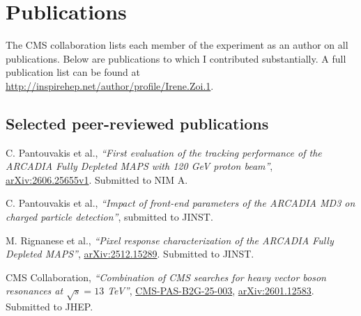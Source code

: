 \ifacademic
  \section{Publications}
The CMS collaboration lists each member of the experiment as an author on all publications. Below are publications to which I contributed substantially. A full publication list can be found at \\ \href{http://inspirehep.net/author/profile/Irene.Zoi.1}{http://inspirehep.net/author/profile/Irene.Zoi.1}.  

\subsection{Selected peer-reviewed publications}

\begin{refsection}
      \vspace{2mm}
      \onehalfspacing
C. Pantouvakis et al., {\sl ``First evaluation of the tracking performance of the ARCADIA Fully Depleted MAPS with 120 GeV proton beam''}, \href{https://arxiv.org/html/2606.25655v1}{arXiv:2606.25655v1}. Submitted to NIM A.
    \end{refsection}


\begin{refsection}
      \vspace{2mm}
      \onehalfspacing
C. Pantouvakis et al., {\sl ``Impact of front-end parameters of the ARCADIA MD3 on charged particle detection''}, submitted to JINST.
    \end{refsection}


\begin{refsection}
      \vspace{2mm}
      \onehalfspacing
M. Rignanese et al., {\sl ``Pixel response characterization of the ARCADIA Fully Depleted MAPS''},
\href{https://doi.org/10.48550/arXiv.2512.15289}{arXiv:2512.15289}. Submitted to JINST.
    \end{refsection}


    \begin{refsection}
      \vspace{2mm}
      \onehalfspacing
CMS Collaboration, {\sl ``Combination of CMS searches for heavy vector boson resonances at  $\sqrt{s}=13$ TeV''},
\href{https://cds.cern.ch/record/2945027/}{CMS-PAS-B2G-25-003}, \href{https://arxiv.org/abs/2601.12583}{arXiv:2601.12583}. Submitted to JHEP.
    \end{refsection}


